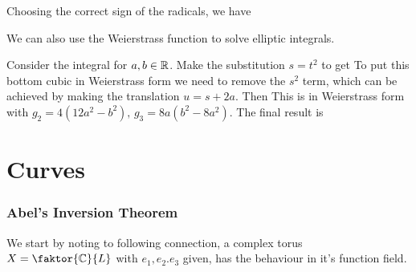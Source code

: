 \documentclass{article}
\begin{document}
\begin{example}
	Choosing the correct sign of the radicals, we have 
\end{example}

We can also use the Weierstrass function to solve elliptic integrals.

\begin{example}
	Consider the integral 
for $a,b \in \mathbb{R}$. Make the substitution $s=t^2$ to get 
To put this bottom cubic in Weierstrass form we need to remove the $s^2$ term, which can be achieved by making the translation $u = s+2a$. Then 
This is in Weierstrass form with $g_2 = 4(12a^2-b^2), \, g_3 = 8a(b^2-8a^2)$. The final result is 

\end{example}

\part{Curves}

\section{Abel's Inversion Theorem}

We start by noting to following connection, a complex torus $X = \faktor{\mbb{C}}{L}$ with $e_1, e_2. e_3$ given, has the behaviour 
in it's function field. 
	


\end{document}
